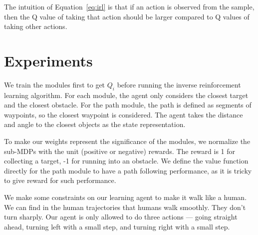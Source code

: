 \documentclass[11pt]{article} %
\begin{document}
The intuition of Equation~\ref{eq:irl} is that if an action is observed from the
sample, then the Q value of taking that action should be larger compared to Q
values of taking other actions.

\section{Experiments}
\label{sec:exp}

We train the modules first to get $Q_i$ before running the inverse reinforcement
learning algorithm. For each module, the agent only considers the closest target
and the closest obstacle. For the path module, the path is defined as segments
of waypoints, so the closest waypoint is considered. The agent takes the
distance and angle to the closest objects as the state representation.

To make our weights represent the significance of the modules, we
normalize the sub-MDPs with the unit (positive or negative) rewards. The reward
is 1 for collecting a target, -1 for running into an obstacle. We define the
value function directly for the path module to have a path following
performance, as it is tricky to give reward for such performance.

We make some constraints on our learning agent to make it walk like a human.
We can find in the human trajectories that humans walk smoothly. They don't turn
sharply.  Our agent is only allowed to do three actions --- going straight ahead,
turning left with a small step, and turning right with a small step.
\end{document}
